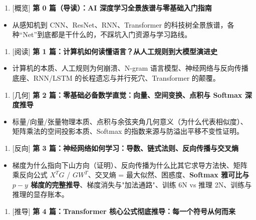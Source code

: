 \begin{enumerate}
  \item {}[概览] \textbf{\textbf{第 0 篇（导读）：AI 深度学习全景族谱与零基础入门指南}}
\end{enumerate}

\begin{itemize}
  \item 从感知机到 CNN、ResNet、RNN、Transformer 的科技树全景族谱，各种“Net”到底都是干什么的，不踩坑入门资源与学习路线。
\end{itemize}

\begin{enumerate}
  \item {}[阅读] \textbf{\textbf{第 1 篇：计算机如何读懂语言？从人工规则到大模型演进史}}
\end{enumerate}

\begin{itemize}
  \item 计算机的本质、人工规则为何崩溃、N-gram 语言模型、神经网络与反向传播底座、RNN/LSTM 的长程遗忘与并行死穴、Transformer 的颠覆。
\end{itemize}

\begin{enumerate}
  \item {}[几何] \textbf{\textbf{第 2 篇：零基础必备数学直觉：向量、空间变换、点积与 Softmax 深度推导}}
\end{enumerate}

\begin{itemize}
  \item 标量/向量/张量物理本质、点积与余弦夹角几何意义（为什么代表相似度）、矩阵乘法的空间投影本质、Softmax 的指数来源与防溢出平移不变性证明。
\end{itemize}

\begin{enumerate}
  \item {}[反向] \textbf{\textbf{第 3 篇：神经网络如何学习：导数、链式法则、反向传播与交叉熵}}
\end{enumerate}

\begin{itemize}
  \item 梯度为什么指向下山方向（证明）、反向传播为什么比其它求导方法快、矩阵乘反向公式 $X^TG$ / $GW^T$、交叉熵 = 最大似然、困惑度、\textbf{Softmax 雅可比与 $p - y$ 梯度的完整推导}、梯度消失与"加法通路"、训练 6N vs 推理 2N、训练与推理的显存账本。
\end{itemize}

\begin{enumerate}
  \item {}[推导] \textbf{\textbf{第 4 篇：Transformer 核心公式彻底推导：每一个符号从何而来}}
\end{enumerate}

